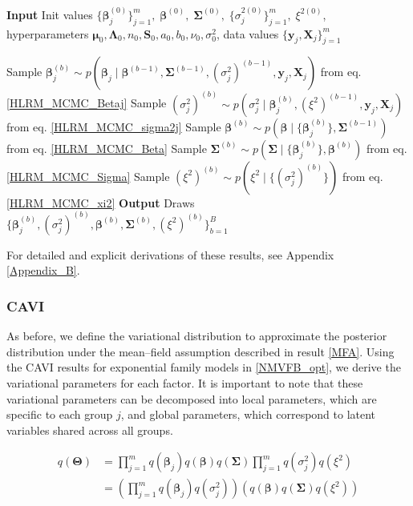 \begin{algorithm}[H]
\caption{Gibbs Sampling for HLRM}
\begin{algorithmic}
\State \textbf{Input} Init values $\{\bm{\beta}_j^{(0)}\}_{j=1}^m,\; \bm{\beta}^{(0)},\; \bm{\Sigma}^{(0)},\; \{\sigma_j^{2(0)}\}_{j=1}^m,\; \xi^{2(0)}$, hyperparameters $\bm{\mu}_0,\bm{\Lambda}_0, n_0,\bm{S}_0,a_0,b_0,\nu_0,\sigma_0^2$, data values $\{\bm{y}_j,\bm{X}_j\}_{j=1}^m$

    \State Sample $\bm{\beta}_j^{(b)} \sim p\!\left(\bm{\beta}_j \mid \bm{\beta}^{(b-1)},\bm{\Sigma}^{(b-1)},(\sigma_j^2)^{(b-1)},\bm{y}_j,\bm{X}_j\right)$ from eq. \ref{HLRM_MCMC_Betaj}
    \State Sample $(\sigma_j^2)^{(b)} \sim p\!\left(\sigma_j^2 \mid \bm{\beta}_j^{(b)},(\xi^2)^{(b-1)},\bm{y}_j,\bm{X}_j\right)$ from eq. \ref{HLRM_MCMC_sigma2j}
  \EndFor
  \State Sample $\bm{\beta}^{(b)} \sim p\!\left(\bm{\beta} \mid \{\bm{\beta}_j^{(b)}\},\bm{\Sigma}^{(b-1)}\right)$ from eq. \ref{HLRM_MCMC_Beta}
  \State Sample $\bm{\Sigma}^{(b)} \sim p\!\left(\bm{\Sigma} \mid \{\bm{\beta}_j^{(b)}\},\bm{\beta}^{(b)}\right)$ from eq. \ref{HLRM_MCMC_Sigma}
  \State Sample $(\xi^2)^{(b)} \sim p\!\left(\xi^2 \mid \{(\sigma_j^2)^{(b)}\}\right)$ from eq. \ref{HLRM_MCMC_xi2}
\EndFor
\State \textbf{Output} Draws $\{\bm{\beta}_j^{(b)},(\sigma_j^2)^{(b)},\bm{\beta}^{(b)},\bm{\Sigma}^{(b)},(\xi^2)^{(b)}\}_{b=1}^B$
\end{algorithmic}
\end{algorithm}

For detailed and explicit derivations of these results, see Appendix \ref{Appendix_B}.

\subsubsection{CAVI}

As before, we define the variational distribution to approximate the posterior distribution under the mean--field assumption described in result \ref{MFA}. Using the CAVI results for exponential family models in \ref{NMVFB_opt}, we derive the variational parameters for each factor. It is important to note that these variational parameters can be decomposed into local parameters, which are specific to each group $j$, and global parameters, which correspond to latent variables shared across all groups.


\begin{equation}
\label{Q_HLRM}
\begin{split}
q(\bm{\Theta})&=\prod_{j=1}^{m}q(\bm{\beta}_j)q(\bm{\beta})q(\bm{\Sigma})\prod_{j=1}^{m}q(\sigma_j^2)q(\xi^2)\\
&= \left(\prod_{j=1}^{m}q(\bm{\beta}_j)q(\sigma_j^2)\right)\left(q(\bm{\beta})q(\bm{\Sigma})q(\xi^2)\right)
\end{split}
\end{equation}

